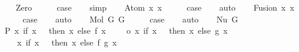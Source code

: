\begin{isabellebody}
\ \ \isamarkupfalse%
\ Zero\isanewline
\ \ \isamarkupfalse%
\ \isamarkupfalse%
\ {\isacharquery}{\kern0pt}case\isanewline
\ \ \isamarkupfalse%
\ simp\isanewline
{}\isamarkupfalse%
\isanewline
\ \ \isamarkupfalse%
\ {\isacharparenleft}{\kern0pt}Atom\ x{}\ x{}{\isacharparenright}{\kern0pt}\isanewline
\ \ \isamarkupfalse%
\ \isamarkupfalse%
\ {\isacharquery}{\kern0pt}case\isanewline
\ \ \isamarkupfalse%
\ auto\isanewline
{}\isamarkupfalse%
\isanewline
\ \ \isamarkupfalse%
\ {\isacharparenleft}{\kern0pt}Fusion\ x{}\ x{}{\isacharparenright}{\kern0pt}\isanewline
\ \ \isamarkupfalse%
\ \isamarkupfalse%
\ {\isacharquery}{\kern0pt}case\isanewline
\ \ \isamarkupfalse%
\ auto\isanewline
{}\isamarkupfalse%
\isanewline
\ \ \isamarkupfalse%
\ {\isacharparenleft}{\kern0pt}Mol\ G{}\ G{}{\isacharparenright}{\kern0pt}\isanewline
\ \ \isamarkupfalse%
\ \isamarkupfalse%
\ {\isacharquery}{\kern0pt}case\isanewline
\ \ \isamarkupfalse%
\ auto\isanewline
{}\isamarkupfalse%
\isanewline
\ \ \isamarkupfalse%
\ {\isacharparenleft}{\kern0pt}Nu\ G{\isacharparenright}{\kern0pt}\isanewline
\ \ \isamarkupfalse%
\ P{}{\isacharcolon}{\kern0pt}\ {\isachardoublequoteopen}{\isacharparenleft}{\kern0pt}{\isasymlambda}x{\isachardot}{\kern0pt}\ if\ x\ {\isacharequal}{\kern0pt}\ {}\ then\ x\ else\ f\ {\isacharparenleft}{\kern0pt}x\ {\isacharminus}{\kern0pt}\ {}{\isacharparenright}{\kern0pt}\ {\isacharplus}{\kern0pt}\ {}{\isacharparenright}{\kern0pt}\ o\ {\isacharparenleft}{\kern0pt}{\isasymlambda}x{\isachardot}{\kern0pt}\ if\ x\ {\isacharequal}{\kern0pt}\ {}\ then\ x\ else\ g\ {\isacharparenleft}{\kern0pt}x\ {\isacharminus}{\kern0pt}\ {}{\isacharparenright}{\kern0pt}\ {\isacharplus}{\kern0pt}\ {}{\isacharparenright}{\kern0pt}\ {\isacharequal}{\kern0pt}\isanewline
\ \ \ \ {\isacharparenleft}{\kern0pt}{\isasymlambda}x{\isachardot}{\kern0pt}\ if\ x\ {\isacharequal}{\kern0pt}\ {}\ then\ x\ else\ f\ {\isacharparenleft}{\kern0pt}g\ {\isacharparenleft}{\kern0pt}x\ {\isacharminus}{\kern0pt}\ {}{\isacharparenright}{\kern0pt}{\isacharparenright}{\kern0pt}\ {\isacharplus}{\kern0pt}\ {}{\isacharparenright}{\kern0pt}{\isachardoublequoteclose}\isanewline

\end{isabellebody}
